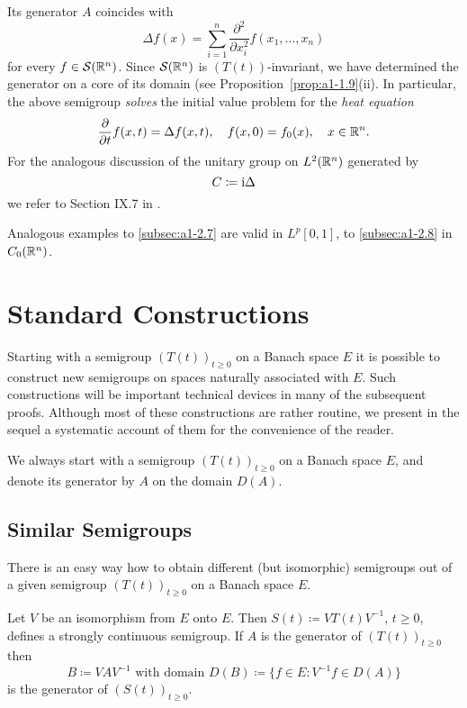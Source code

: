 Its generator $A$ coincides with
\[
    \Delta f(x) = \sum_{i=1}^{n} \frac{\partial^{2}}{\partial x_{i}^{2}} f(x_{1},\ldots,x_{n})
\]
for every $f \in \mathcal{S}(\mathbb{R}^{n})$.
Since $\mathcal{S}(\mathbb{R}^{n})$ is $(T(t))$-invariant, we have determined the generator on a core of its domain (see Proposition~\ref{prop:a1-1.9}(ii).
In particular, the above semigroup \emph{solves} the initial value problem for the \emph{heat equation}
\[
    \frac{\partial}{\partial t} f(x,t) = \Delta f(x,t), \quad f(x,0) = f_{0}(x), \quad x \in \mathbb{R}^{n}.
\]
For the analogous discussion of the unitary group on $L^{2}(\mathbb{R}^{n})$ generated by
\[
    C \coloneqq \mathrm{i}\Delta
\]
we refer to Section IX.7 in \citet{reedsimon:1975}. 

Analogous examples to \ref{subsec:a1-2.7} are valid in $L^{p}\left[ 0,1 \right]$, \resp to 
\ref{subsec:a1-2.8} in $C_{0}(\mathbb{R}^{n})$.
\section{Standard Constructions}\label{sec:a1-3}%
Starting with a semigroup $(T(t))_{t \geq 0}$ on a Banach space $E$ it is possible to construct new semigroups on spaces naturally associated with $E$.
Such constructions will be important technical devices in many of the subsequent proofs.
Although most of these constructions are rather routine, we present in the sequel a systematic account of them for the convenience of the reader.

We always start with a semigroup $(T(t))_{t \geq 0}$ on a Banach space $E$, and denote its generator by $A$ on the domain $D(A)$.
\subsection{Similar Semigroups}\label{subsec:a1-3.1}%
There is an easy way how to obtain different (but isomorphic) semigroups out of a given semigroup $(T(t))_{t \geq 0}$ on a Banach space $E$.

Let $V$ be an isomorphism from $E$ onto $E$.
Then $S(t) \coloneqq VT(t)V^{-1}$, $t \geq 0$, defines a strongly continuous semigroup.
If $A$ is the generator of $(T(t))_{t \geq 0}$ then
\[
    B \coloneqq VAV^{-1} \text{ with domain } D(B) \coloneqq \{f \in E \colon V^{-1}f \in D(A)\}
\]
is the generator of $(S(t))_{t \geq 0}$.
